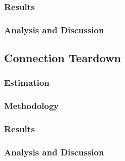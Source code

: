 \subsubsection{Results}
\subsubsection{Analysis and Discussion}
\subsection{Connection Teardown}
\subsubsection{Estimation}
\subsubsection{Methodology}
\subsubsection{Results}
\subsubsection{Analysis and Discussion}


